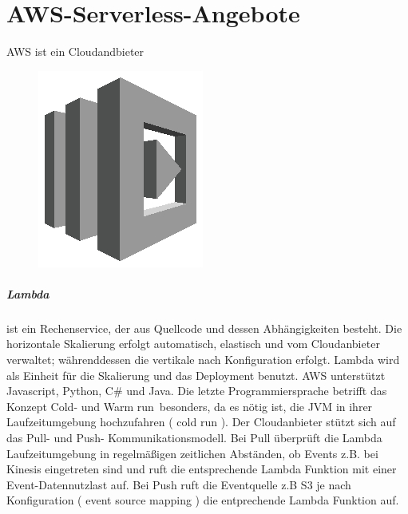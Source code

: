 \documentclass[
12pt,
english,
ngerman,
headsepline,
twoside,
openright,
numbers=noenddot,version=first
]{scrreprt}
\begin{document}
\chapter{AWS-Serverless-Angebote}
\label{chap:aws-serverless}
\acrshort{AWS} ist ein Cloudandbieter

\begin{figure}
	\includegraphics[width=0.9\linewidth]{./pics/aws/Compute_GRAYSCALE_AWSLambda.eps}
\end{figure}
\paragraph{Lambda}\label{par:lambda} ist ein Rechenservice, der aus Quellcode und dessen Abhängigkeiten besteht. Die horizontale Skalierung erfolgt automatisch, elastisch und vom Cloudanbieter verwaltet; währenddessen die vertikale nach Konfiguration erfolgt. Lambda wird als Einheit für die Skalierung und das Deployment benutzt. \acrshort{AWS} unterstützt Javascript, Python, C\# und Java. Die letzte Programmiersprache betrifft das Konzept \glqq Cold- und Warm run\grqq\ besonders, da es nötig ist, die \acrfull{JVM} in ihrer Laufzeitumgebung hochzufahren ( cold run ). Der Cloudanbieter stützt sich auf das Pull- und Push- Kommunikationsmodell. Bei Pull überprüft die Lambda Laufzeitumgebung in regelmäßigen zeitlichen Abständen, ob Events z.B. bei Kinesis eingetreten sind und ruft die entsprechende Lambda Funktion mit einer Event-Datennutzlast auf. Bei Push ruft die Eventquelle z.B S3 je nach Konfiguration ( event source mapping ) die entprechende Lambda Funktion auf. 
\end{document}
